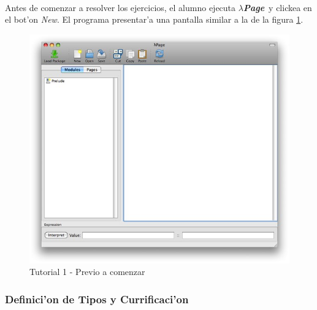\documentclass[a4paper]{article}
\newcommand{\hpage}{\textbf{\textsl{$\lambda$Page}}}
\begin{document}
\paragraph{}Antes de comenzar a resolver los ejercicios, el alumno ejecuta \hpage\ y clickea en el bot'on \textsl{New}.  El programa presentar'a una pantalla similar a la de la figura \ref{tut100}.
\begin{figure}[hp]
	\begin{center}
        	\includegraphics[width=.9\textwidth]{pictures/tut1/00}
		\caption{Tutorial 1 - Previo a comenzar}
		\label{tut100}
	\end{center}
\end{figure}

\subsubsection{Definici'on de Tipos y Currificaci'on}
\end{document}

